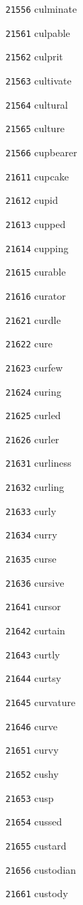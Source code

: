 \documentclass[twoside,11pt]{article}
\begin{document}
\begin{multicols}{5}
\begin{enumerate}
\item[\texttt{21556}] culminate
\item[\texttt{21561}] culpable
\item[\texttt{21562}] culprit
\item[\texttt{21563}] cultivate
\item[\texttt{21564}] cultural
\item[\texttt{21565}] culture
\item[\texttt{21566}] cupbearer
\item[\texttt{21611}] cupcake
\item[\texttt{21612}] cupid
\item[\texttt{21613}] cupped
\item[\texttt{21614}] cupping
\item[\texttt{21615}] curable
\item[\texttt{21616}] curator
\item[\texttt{21621}] curdle
\item[\texttt{21622}] cure
\item[\texttt{21623}] curfew
\item[\texttt{21624}] curing
\item[\texttt{21625}] curled
\item[\texttt{21626}] curler
\item[\texttt{21631}] curliness
\item[\texttt{21632}] curling
\item[\texttt{21633}] curly
\item[\texttt{21634}] curry
\item[\texttt{21635}] curse
\item[\texttt{21636}] cursive
\item[\texttt{21641}] cursor
\item[\texttt{21642}] curtain
\item[\texttt{21643}] curtly
\item[\texttt{21644}] curtsy
\item[\texttt{21645}] curvature
\item[\texttt{21646}] curve
\item[\texttt{21651}] curvy
\item[\texttt{21652}] cushy
\item[\texttt{21653}] cusp
\item[\texttt{21654}] cussed
\item[\texttt{21655}] custard
\item[\texttt{21656}] custodian
\item[\texttt{21661}] custody

\end{enumerate}
\end{multicols}
\end{document}
